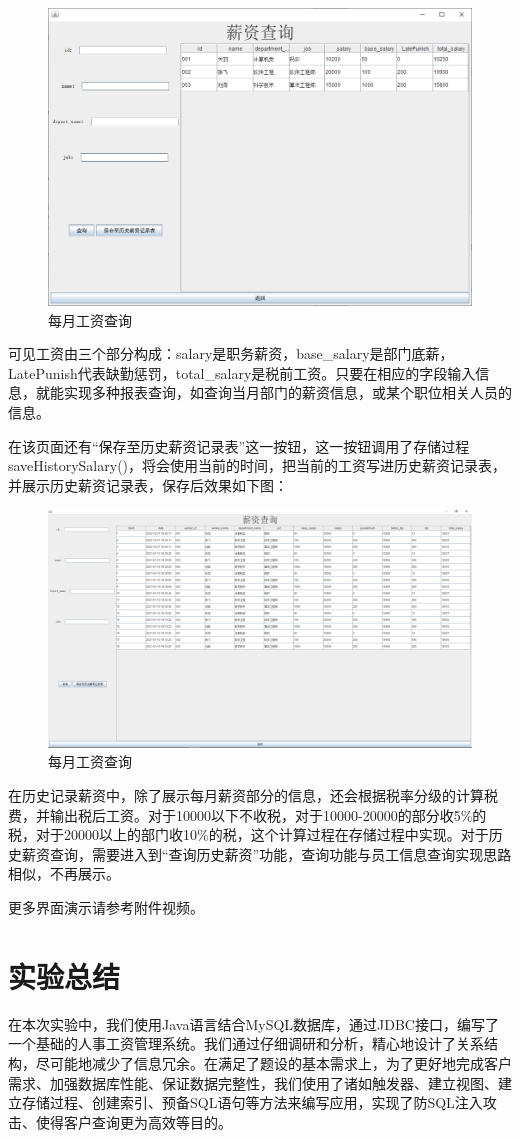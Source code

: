 \documentclass[withoutpreface,bwprint]{cumcmthesis} %
\begin{document}
\begin{figure}[H]
    \centering
    \includegraphics[width=0.8\linewidth]{salary}
    \caption{每月工资查询}
\end{figure}
可见工资由三个部分构成：salary是职务薪资，base\_salary是部门底薪，LatePunish代表缺勤惩罚，total\_salary是税前工资。只要在相应的字段输入信息，就能实现多种报表查询，如查询当月部门的薪资信息，或某个职位相关人员的信息。 \par
在该页面还有“保存至历史薪资记录表”这一按钮，这一按钮调用了存储过程saveHistorySalary()，将会使用当前的时间，把当前的工资写进历史薪资记录表，并展示历史薪资记录表，保存后效果如下图：
\begin{figure}[H]
    \centering
    \includegraphics[width=0.8\linewidth]{saveSalary}
    \caption{每月工资查询}
\end{figure}
在历史记录薪资中，除了展示每月薪资部分的信息，还会根据税率分级的计算税费，并输出税后工资。对于10000以下不收税，对于10000-20000的部分收5\%的税，对于20000以上的部门收10\%的税，这个计算过程在存储过程中实现。对于历史薪资查询，需要进入到“查询历史薪资”功能，查询功能与员工信息查询实现思路相似，不再展示。\par
更多界面演示请参考附件视频。

\section{实验总结}
在本次实验中，我们使用Java语言结合MySQL数据库，通过JDBC接口，编写了一个基础的人事工资管理系统。我们通过仔细调研和分析，精心地设计了关系结构，尽可能地减少了信息冗余。在满足了题设的基本需求上，为了更好地完成客户需求、加强数据库性能、保证数据完整性，我们使用了诸如触发器、建立视图、建立存储过程、创建索引、预备SQL语句等方法来编写应用，实现了防SQL注入攻击、使得客户查询更为高效等目的。
\end{document}
